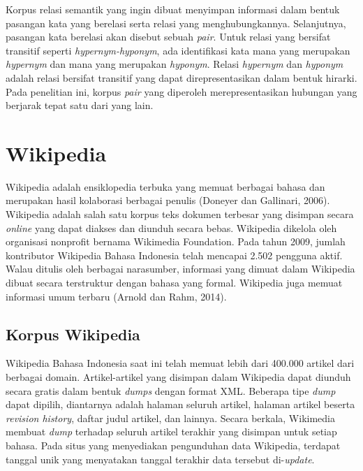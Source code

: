 Korpus relasi semantik yang ingin dibuat menyimpan informasi dalam bentuk pasangan kata yang berelasi serta relasi yang menghubungkannya. Selanjutnya, pasangan kata berelasi akan disebut sebuah \textit{pair}. Untuk relasi yang bersifat transitif seperti \textit{hypernym-hyponym}, ada identifikasi kata mana yang merupakan \textit{hypernym} dan mana yang merupakan \textit{hyponym}. Relasi \textit{hypernym} dan \textit{hyponym} adalah relasi bersifat transitif yang dapat direpresentasikan dalam bentuk hirarki. Pada penelitian ini, korpus \textit{pair} yang diperoleh merepresentasikan hubungan yang berjarak tepat satu dari yang lain. 

\section{Wikipedia}
Wikipedia adalah ensiklopedia terbuka yang memuat berbagai bahasa dan merupakan hasil kolaborasi berbagai penulis (Doneyer dan Gallinari, 2006). Wikipedia adalah salah satu korpus teks dokumen terbesar yang disimpan secara \textit{online} yang dapat diakses dan diunduh secara bebas. Wikipedia dikelola oleh organisasi nonprofit bernama Wikimedia Foundation. Pada tahun 2009, jumlah kontributor Wikipedia Bahasa Indonesia telah mencapai 2.502 pengguna aktif. Walau ditulis oleh berbagai narasumber, informasi yang dimuat dalam Wikipedia dibuat secara terstruktur dengan bahasa yang formal. Wikipedia juga memuat informasi umum terbaru (Arnold dan Rahm, 2014).

\subsection{Korpus Wikipedia}
Wikipedia Bahasa Indonesia saat ini telah memuat lebih dari 400.000 artikel dari berbagai domain. Artikel-artikel yang disimpan dalam Wikipedia dapat diunduh secara gratis dalam bentuk \textit{dumps} dengan format XML. Beberapa tipe \textit{dump} dapat dipilih, diantarnya adalah halaman seluruh artikel, halaman artikel beserta \textit{revision history}, daftar judul artikel, dan lainnya. Secara berkala, Wikimedia membuat \textit{dump} terhadap seluruh artikel terakhir yang disimpan untuk setiap bahasa. Pada situs yang menyediakan pengunduhan data Wikipedia, terdapat tanggal unik yang menyatakan tanggal terakhir data tersebut di-\textit{update}.

